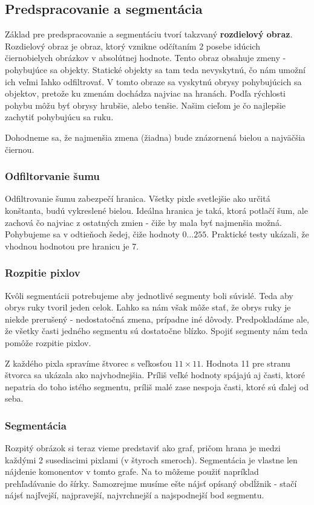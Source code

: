 \subsection{Predspracovanie a segmentácia}\label{chap:preprocess}

Základ pre predspracovanie a segmentáciu tvorí takzvaný \textbf{rozdielový obraz}. Rozdielový obraz je obraz, ktorý vznikne odčítaním 2 posebe idúcich čiernobielych obrázkov v absolútnej hodnote. Tento obraz obsahuje zmeny - pohybujúce sa objekty. Statické objekty sa tam teda nevyskytnú, čo nám umožní ich veľmi ľahko odfiltrovať. V tomto obraze sa vyskytnú obrysy pohybujúcich sa objektov, pretože ku zmenám dochádza najviac na hranách. Podľa rýchlosti pohybu môžu byť obrysy hrubšie, alebo tenšie. 
Našim cieľom je čo najlepšie zachytiť pohybujúcu sa ruku.

Dohodneme sa, že najmenšia zmena (žiadna) bude znázornená bielou a najväčšia čiernou. 

\subsubsection{Odfiltorvanie šumu}
Odfiltrovanie šumu zabezpečí hranica. Všetky pixle svetlejšie ako určitá konštanta, budú vykreslené bielou. Ideálna hranica je taká, ktorá potlačí šum, ale zachová čo najviac z ostatných zmien - čiže by mala byť najmenšia možná. Pohybujeme sa v odtieňoch šedej, čiže hodnoty $0\dots 255$. Praktické testy ukázali, že vhodnou hodnotou pre hranicu je 7.

\subsubsection{Rozpitie pixlov}

Kvôli segmentácii potrebujeme aby jednotlivé segmenty boli súvislé. Teda aby obrys ruky tvoril jeden celok.
Ľahko sa nám však môže stať, že obrys ruky je niekde prerušený - nedostatočná zmena, prípadne iné dôvody. Predpokladáme ale, že všetky časti jedného segmentu sú dostatočne blízko. Spojiť segmenty nám teda pomôže rozpitie pixlov. 

Z každého pixla spravíme štvorec s veľkosťou $11\times 11$.
Hodnota 11 pre stranu štvorca sa ukázala ako najvhodnejšia. 
Príliš veľké hodnoty spájajú aj časti, ktoré nepatria do toho istého segmentu, príliš malé zase nespoja časti, ktoré sú ďalej od seba.

\subsubsection{Segmentácia}\label{subsubsect:segment}
Rozpitý obrázok si teraz vieme predstaviť ako graf, pričom hrana je medzi každými 2 susediacimi pixlami (v štyroch smeroch). Segmentácia je vlastne len nájdenie komonentov v tomto grafe. Na to môžeme použiť napríklad prehľadávanie do šírky. Samozrejme musíme ešte nájsť opísaný obdĺžnik - stačí nájsť najľvejší, najpravejší, najvrchnejší a najspodnejší bod segmentu.

